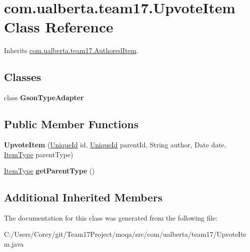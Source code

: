 \hypertarget{classcom_1_1ualberta_1_1team17_1_1_upvote_item}{\section{com.\+ualberta.\+team17.\+Upvote\+Item Class Reference}
\label{classcom_1_1ualberta_1_1team17_1_1_upvote_item}
}


Inherits \hyperlink{classcom_1_1ualberta_1_1team17_1_1_authored_item}{com.\+ualberta.\+team17.\+Authored\+Item}.

\subsection*{Classes}
\begin{DoxyCompactItemize}
\item 
class {\bfseries Gson\+Type\+Adapter}
\end{DoxyCompactItemize}
\subsection*{Public Member Functions}
\begin{DoxyCompactItemize}
\item 
\hypertarget{classcom_1_1ualberta_1_1team17_1_1_upvote_item_a5c1416845f5745ca540fe73d4c5bf532}{{\bfseries Upvote\+Item} (\hyperlink{classcom_1_1ualberta_1_1team17_1_1_unique_id}{Unique\+Id} id, \hyperlink{classcom_1_1ualberta_1_1team17_1_1_unique_id}{Unique\+Id} parent\+Id, String author, Date date, \hyperlink{enumcom_1_1ualberta_1_1team17_1_1_item_type}{Item\+Type} parent\+Type)}\label{classcom_1_1ualberta_1_1team17_1_1_upvote_item_a5c1416845f5745ca540fe73d4c5bf532}

\item 
\hypertarget{classcom_1_1ualberta_1_1team17_1_1_upvote_item_a474a9efcdffde26d636edca960cba7c9}{\hyperlink{enumcom_1_1ualberta_1_1team17_1_1_item_type}{Item\+Type} {\bfseries get\+Parent\+Type} ()}\label{classcom_1_1ualberta_1_1team17_1_1_upvote_item_a474a9efcdffde26d636edca960cba7c9}

\end{DoxyCompactItemize}
\subsection*{Additional Inherited Members}


The documentation for this class was generated from the following file\+:\begin{DoxyCompactItemize}
\item 
C\+:/\+Users/\+Corey/git/\+Team17\+Project/moqa/src/com/ualberta/team17/Upvote\+Item.\+java\end{DoxyCompactItemize}
